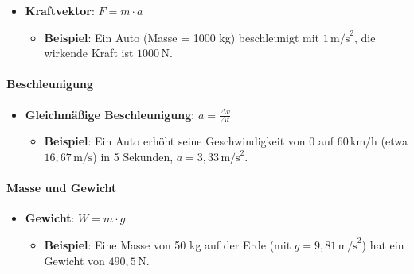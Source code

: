 \documentclass{vorlage-design-main}
\begin{document}
\begin{itemize}

\item
  \textbf{Kraftvektor}: $F = m \cdot a$

  \begin{itemize}
  
  \item
    \textbf{Beispiel}: Ein Auto (Masse = 1000 kg) beschleunigt mit
    $1 \, \text{m/s}^2$, die wirkende Kraft ist $1000 \, \text{N}$.
  \end{itemize}
\end{itemize}

\hypertarget{beschleunigung}{%
\paragraph{Beschleunigung}\label{beschleunigung}}

\begin{itemize}

\item
  \textbf{Gleichmäßige Beschleunigung}:
  $a = \frac{\Delta v}{\Delta t}$

  \begin{itemize}
  
  \item
    \textbf{Beispiel}: Ein Auto erhöht seine Geschwindigkeit von 0 auf
    $60 \, \text{km/h}$ (etwa $16,67 \, \text{m/s}$) in 5 Sekunden,
    $a = 3,33 \, \text{m/s}^2$.
  \end{itemize}
\end{itemize}

\hypertarget{masse-und-gewicht}{%
\paragraph{Masse und Gewicht}\label{masse-und-gewicht}}

\begin{itemize}

\item
  \textbf{Gewicht}: $W = m \cdot g$

  \begin{itemize}
  
  \item
    \textbf{Beispiel}: Eine Masse von 50 kg auf der Erde (mit
    $g = 9,81 \, \text{m/s}^2$) hat ein Gewicht von
    $490,5 \, \text{N}$.
  \end{itemize}
\end{itemize}
\end{document}
